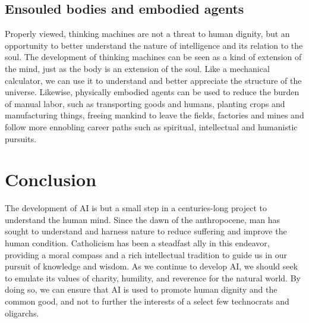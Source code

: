 \documentclass[sigplan,nonacm]{acmart}\settopmatter{printfolios=false,printccs=false,printacmref=false}
\begin{document}
  \subsection{Ensouled bodies and embodied agents}

  Properly viewed, thinking machines are not a threat to human dignity, but an opportunity to better understand the nature of intelligence and its relation to the soul. The development of thinking machines can be seen as a kind of extension of the mind, just as the body is an extension of the soul. Like a mechanical calculator, we can use it to understand and better appreciate the structure of the universe. Likewise, physically embodied agents can be used to reduce the burden of manual labor, such as transporting goods and humans, planting crops and manufacturing things, freeing mankind to leave the fields, factories and mines and follow more ennobling career paths such as spiritual, intellectual and humanistic pursuits.

  \pagebreak

  \section{Conclusion}

  The development of AI is but a small step in a centuries-long project to understand the human mind. Since the dawn of the anthropocene, man has sought to understand and harness nature to reduce suffering and improve the human condition. Catholicism has been a steadfast ally in this endeavor, providing a moral compass and a rich intellectual tradition to guide us in our pursuit of knowledge and wisdom. As we continue to develop AI, we should seek to emulate its values of charity, humility, and reverence for the natural world. By doing so, we can ensure that AI is used to promote human dignity and the common good, and not to further the interests of a select few technocrats and oligarchs.

  
\end{document}
